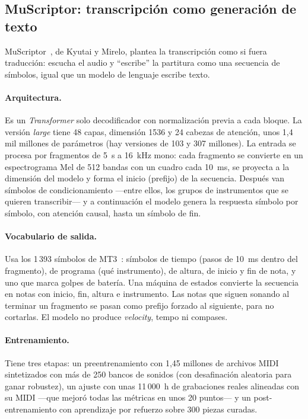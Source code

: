 \documentclass[11pt,a4paper]{article}
\begin{document}
\subsection{MuScriptor: transcripción como generación de texto}
MuScriptor~\cite{rouard2026muscriptor}, de Kyutai y Mirelo, plantea la transcripción como si fuera
traducción: escucha el audio y ``escribe'' la partitura como una secuencia de símbolos, igual que un
modelo de lenguaje escribe texto.

\paragraph{Arquitectura.} Es un \emph{Transformer} solo decodificador con normalización previa a cada
bloque. La versión \emph{large} tiene 48 capas, dimensión 1536 y 24 cabezas de atención, unos 1{,}4 mil
millones de parámetros (hay versiones de 103 y 307 millones). La entrada se procesa por fragmentos de
5~s a 16~kHz mono: cada fragmento se convierte en un espectrograma Mel de 512 bandas con un cuadro cada
10~ms, se proyecta a la dimensión del modelo y forma el inicio (prefijo) de la secuencia. Después van
símbolos de condicionamiento ---entre ellos, los grupos de instrumentos que se quieren transcribir--- y a
continuación el modelo genera la respuesta símbolo por símbolo, con atención causal, hasta un símbolo
de fin.

\paragraph{Vocabulario de salida.} Usa los 1\,393 símbolos de MT3~\cite{gardner2022mt3}: símbolos de
tiempo (pasos de 10~ms dentro del fragmento), de programa (qué instrumento), de altura, de inicio y fin
de nota, y uno que marca golpes de batería. Una máquina de estados convierte la secuencia en notas con
inicio, fin, altura e instrumento. Las notas que siguen sonando al terminar un fragmento se pasan como
prefijo forzado al siguiente, para no cortarlas. El modelo no produce \emph{velocity}, tempo ni
compases.

\paragraph{Entrenamiento.} Tiene tres etapas: un preentrenamiento con 1{,}45 millones de archivos MIDI
sintetizados con más de 250 bancos de sonidos (con desafinación aleatoria para ganar robustez), un
ajuste con unas 11\,000~h de grabaciones reales alineadas con su MIDI ---que mejoró todas las métricas en
unos 20 puntos--- y un post-entrenamiento con aprendizaje por refuerzo sobre 300 piezas curadas.
\end{document}
